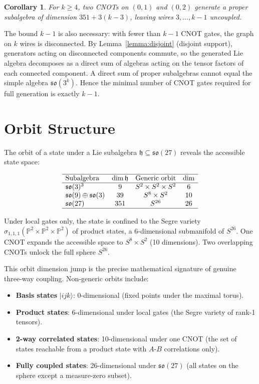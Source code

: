 \documentclass[12pt,a4paper]{article}
\newtheorem{corollary}[theorem]{Corollary}
\begin{document}
\begin{corollary}
\label{cor:minimal}
For $k \ge 4$, two CNOTs on $(0,1)$ and $(0,2)$ generate a proper
subalgebra of dimension $351 + 3(k-3)$, leaving wires $3,\dots,k-1$
uncoupled.
\end{corollary}

The bound $k-1$ is also necessary: with fewer than $k-1$ CNOT
gates, the graph on $k$ wires is disconnected. By Lemma~\ref{lemma:disjoint}
(disjoint support), generators acting on disconnected components commute,
so the generated Lie algebra decomposes as a direct sum of algebras
acting on the tensor factors of each connected component. A direct sum
of proper subalgebras cannot equal the simple algebra
$\mathfrak{so}(3^k)$. Hence the minimal number of CNOT gates required
for full generation is exactly $k-1$.

\section{Orbit Structure}

The orbit of a state under a Lie subalgebra $\mathfrak{h} \subseteq
\mathfrak{so}(27)$ reveals the accessible state space:

\[
\begin{array}{lccc}
\hline
\text{Subalgebra} & \dim \mathfrak{h} & \text{Generic orbit} & \dim \\
\hline
\mathfrak{so}(3)^3 & 9 & S^2 \times S^2 \times S^2 & 6 \\
\mathfrak{so}(9) \oplus \mathfrak{so}(3) & 39 & S^8 \times S^2 & 10 \\
\mathfrak{so}(27) & 351 & S^{26} & 26 \\
\hline
\end{array}
\]

Under local gates only, the state is confined to the Segre variety
$\sigma_{1,1,1}(\mathbb{P}^2 \times \mathbb{P}^2 \times \mathbb{P}^2)$
of product states, a 6-dimensional submanifold of $S^{26}$. One CNOT
expands the accessible space to $S^8 \times S^2$ (10 dimensions).
Two overlapping CNOTs unlock the full sphere $S^{26}$.

This orbit dimension jump is the precise mathematical signature of
genuine three-way coupling. Non-generic orbits include:
\begin{itemize}
\item \textbf{Basis states} $|ijk\rangle$: 0-dimensional (fixed points
under the maximal torus).
\item \textbf{Product states}: 6-dimensional under local gates (the Segre
variety of rank-1 tensors).
\item \textbf{2-way correlated states}: 10-dimensional under one CNOT
(the set of states reachable from a product state with $A$-$B$
correlations only).
\item \textbf{Fully coupled states}: 26-dimensional under $\mathfrak{so}(27)$
(all states on the sphere except a measure-zero subset).
\end{itemize}
\end{document}
